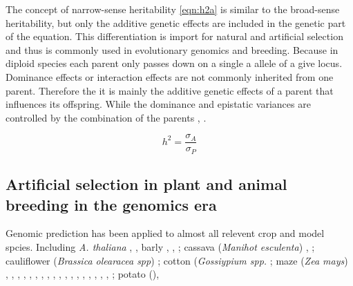 The concept of narrow-sense heritability \ref{eqn:h2a} is similar to the broad-sense heritability, but only the additive genetic
effects are included in the genetic part of the equation. This differentiation is import for natural and artificial selection and
thus is commonly used in evolutionary genomics and breeding. Because in diploid species each parent only passes down on a single a
allele of a give locus. Dominance effects or interaction effects are not commonly inherited from one parent. Therefore the it is
mainly the additive genetic effects of a parent that influences its offspring. While the dominance and epistatic variances are
controlled by the combination of the parents \cite{falconer1996}, \cite{walsh2018}.


\begin{equation}
  h^2 = \frac{\sigma_{A}}{\sigma_{P}}
  \label{eqn:h2a}
\end{equation}



\subsection{Artificial selection in plant and animal breeding in the genomics era}

Genomic prediction has been applied to almost all relevent crop and model spcies. Including \textit{A. thaliana} \cite{hu2015}, \cite{shen2013novel}, barly \cite{neyhart2019}, \cite{oakey2016} , \cite{zhong2009factors} ;
cassava (\textit{Manihot esculenta}) \cite{elias2018}, \cite{elias2018improving} ;
cauliflower (\textit{Brassica olearacea spp})   \cite{thorwarth2018genomic} ;
cotton (\textit{Gossiypium spp.}  \cite{gapare2018} ;
maze (\textit{Zea mays}) \cite{moeinizade2019} , \cite{allier2019usefulness} , \cite{brauner2018genomic},
\cite{schrag2018beyond}, \cite{schopp2017genomic}, \cite{e2017genomic}, \cite{schopp2017accuracy},
\cite{kadam2016genomic}, \cite{bustos2016improvement}, \cite{montesinos2015threshold}, \cite{owens2014foundation},
\cite{lehermeier2014usefulness},
\cite{technow2014genome}, \cite{peiffer2014genetic} , \cite{riedelsheimer2013genomic}, \cite{guo2013accuracy},
\cite{technow2013genomic}, \cite{windhausen2012} , \cite{rincent2012} ;
potato (\cite{Solanum tuberosum}),  \cite{enciso2018genomic}

